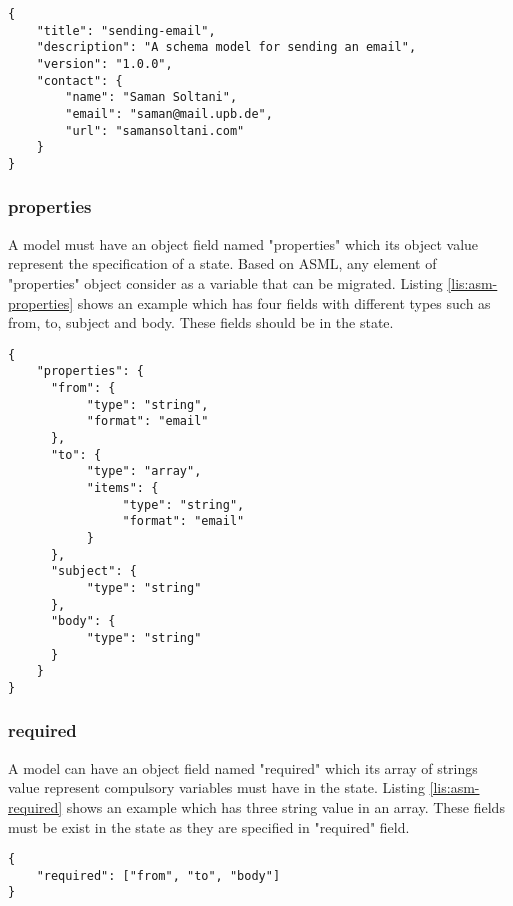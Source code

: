 \lstset{
  label=lis:asm-info, caption=Application State Model "info" field example., 
  basicstyle=\ttfamily\footnotesize, frame=single, captionpos=b,
  xleftmargin=.15\textwidth, xrightmargin=.15\textwidth
}
\begin{lstlisting}
{
    "title": "sending-email",
    "description": "A schema model for sending an email",
    "version": "1.0.0",
    "contact": {
        "name": "Saman Soltani",
        "email": "saman@mail.upb.de",
        "url": "samansoltani.com"
    }
}
\end{lstlisting}

\subsubsection{properties}
A model must have an object field named "properties" which its object value represent the specification of a state. Based on ASML, any element of "properties" object consider as a variable that can be migrated.
Listing \ref{lis:asm-properties} shows an example which has four fields with different types such as from, to, subject and body. These fields should be in the state.

\lstset{
  label=lis:asm-properties, caption=Application State Model "properties" field example., 
  basicstyle=\ttfamily\footnotesize, frame=single, captionpos=b,
  xleftmargin=.15\textwidth, xrightmargin=.15\textwidth
}
\begin{lstlisting}
{
    "properties": {
      "from": {
           "type": "string",
           "format": "email"
      },
      "to": {
           "type": "array",
           "items": {
                "type": "string",
                "format": "email"
           }
      },
      "subject": {
           "type": "string"
      },
      "body": {
           "type": "string"
      }
    }
}
\end{lstlisting}
\subsubsection{required}
A model can have an object field named "required" which its array of strings value represent compulsory variables must have in the state.
Listing \ref{lis:asm-required} shows an example which has three string value in an array. These fields must be exist in the state as they are specified in "required" field.

\lstset{
  label=lis:asm-required, caption=Application State Model "required" field example., 
  basicstyle=\ttfamily\footnotesize, frame=single, captionpos=b,
  xleftmargin=.15\textwidth, xrightmargin=.15\textwidth
}
\begin{lstlisting}
{
    "required": ["from", "to", "body"]
}
\end{lstlisting}

